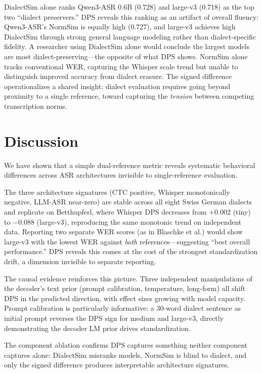 \documentclass[11pt,a4paper]{article}
\begin{document}
DialectSim alone ranks Qwen3-ASR 0.6B (0.728) and large-v3 (0.718) as the top two ``dialect preservers.'' DPS reveals this ranking as an artifact of overall fluency: Qwen3-ASR's NormSim is equally high (0.727), and large-v3 achieves high DialectSim through strong general language modeling rather than dialect-specific fidelity. A researcher using DialectSim alone would conclude the largest models are most dialect-preserving---the opposite of what DPS shows. NormSim alone tracks conventional WER, capturing the Whisper scale trend but unable to distinguish improved accuracy from dialect erasure. The signed difference operationalizes a shared insight: dialect evaluation requires going beyond proximity to a single reference, toward capturing the \textit{tension} between competing transcription norms.

\section{Discussion}

We have shown that a simple dual-reference metric reveals systematic behavioral differences across ASR architectures invisible to single-reference evaluation.

The three architecture signatures (CTC positive, Whisper monotonically negative, LLM-ASR near-zero) are stable across all eight Swiss German dialects and replicate on Betthupferl, where Whisper DPS decreases from $+0.002$ (tiny) to $-0.088$ (large-v3), reproducing the same monotonic trend on independent data. Reporting two separate WER scores (as in Blaschke et al.) would show large-v3 with the lowest WER against \textit{both} references---suggesting ``best overall performance.'' DPS reveals this comes at the cost of the strongest standardization drift, a dimension invisible to separate reporting.

The causal evidence reinforces this picture. Three independent manipulations of the decoder's text prior (prompt calibration, temperature, long-form) all shift DPS in the predicted direction, with effect sizes growing with model capacity. Prompt calibration is particularly informative: a 30-word dialect sentence as initial prompt reverses the DPS sign for medium and large-v3, directly demonstrating the decoder LM prior drives standardization.

The component ablation confirms DPS captures something neither component captures alone: DialectSim misranks models, NormSim is blind to dialect, and only the signed difference produces interpretable architecture signatures.
\end{document}
